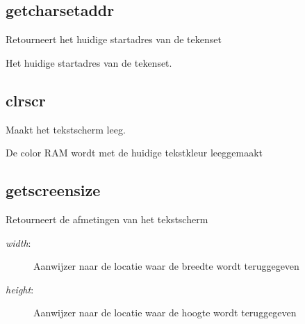 \subsection{getcharsetaddr}
\begin{description}[leftmargin=2.4cm,style=nextline]
\item [Beschrijving:] {Retourneert het huidige startadres van de tekenset}\item [Syntaxis:] \item [Resultaat:] {Het huidige startadres van de tekenset.}
\end{description}

\subsection{clrscr}
\begin{description}[leftmargin=2.4cm,style=nextline]
\item [Beschrijving:] {Maakt het tekstscherm leeg.}\item [Syntaxis:] \item [Opmerkingen:] {De color RAM wordt met de huidige tekstkleur leeggemaakt}
\end{description}

\subsection{getscreensize}
\begin{description}[leftmargin=2.4cm,style=nextline]
\item [Beschrijving:] {Retourneert de afmetingen van het tekstscherm}\item [Syntaxis:] \item [Parameters:]
\begin{description}
\item [{\em width}:] {Aanwijzer naar de locatie waar de breedte wordt teruggegeven}\item [{\em height}:] {Aanwijzer naar de locatie waar de hoogte wordt teruggegeven}
\end{description}
\end{description}


